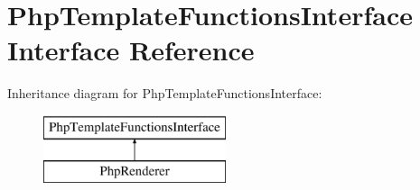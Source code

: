 \hypertarget{interface_pes_1_1_view_1_1_renderer_1_1_php_template_functions_interface}{}\section{Php\+Template\+Functions\+Interface Interface Reference}
\label{interface_pes_1_1_view_1_1_renderer_1_1_php_template_functions_interface}
Inheritance diagram for Php\+Template\+Functions\+Interface\+:\begin{figure}[H]
\begin{center}
\leavevmode
\includegraphics[height=2.000000cm]{interface_pes_1_1_view_1_1_renderer_1_1_php_template_functions_interface}
\end{center}
\end{figure}
